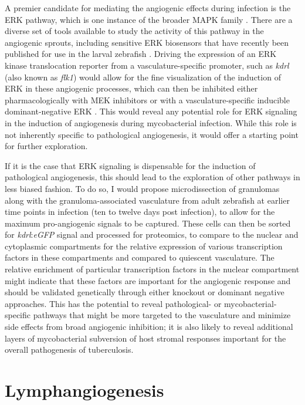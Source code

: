 A premier candidate for mediating the angiogenic effects during infection is the ERK pathway, which is one instance of the broader MAPK family \citep{Shibuya2006, Wang2020b}. There are a diverse set of tools available to study the activity of this pathway in the angiogenic sprouts, including sensitive ERK biosensors that have recently been published for use in the larval zebrafish \citep{DeSimone2021}. Driving the expression of an ERK kinase translocation reporter from a vasculature-specific promoter, such as \textit{kdrl} (also known as \textit{flk1}) would allow for the fine visualization of the induction of ERK in these angiogenic processes, which can then be inhibited either pharmacologically with MEK inhibitors or with a vasculature-specific inducible dominant-negative ERK \citep{Izumi2001}. This would reveal any potential role for ERK signaling in the induction of angiogenesis during mycobacterial infection. While this role is not inherently specific to pathological angiogenesis, it would offer a starting point for further exploration. 

If it is the case that ERK signaling is dispensable for the induction of pathological angiogenesis, this should lead to the exploration of other pathways in less biased fashion. To do so, I would propose microdissection of granulomas along with the granuloma-associated vasculature from adult zebrafish at earlier time points in infection (ten to twelve days post infection), to allow for the maximum pro-angiogenic signals to be captured. These cells can then be sorted for \textit{kdrl}:\textit{eGFP} signal and processed for proteomics, to compare to the nuclear and cytoplasmic compartments for the relative expression of various transcription factors in these compartments and compared to quiescent vasculature. The relative enrichment of particular transcription factors in the nuclear compartment might indicate that these factors are important for the angiogenic response and should be validated genetically through either knockout or dominant negative approaches. This has the potential to reveal pathological- or mycobacterial-specific pathways that might be more targeted to the vasculature and minimize side effects from broad angiogenic inhibition; it is also likely to reveal additional layers of mycobacterial subversion of host stromal responses important for the overall pathogenesis of tuberculosis.

\section{Lymphangiogenesis}\label{lymphangiogenesis}

